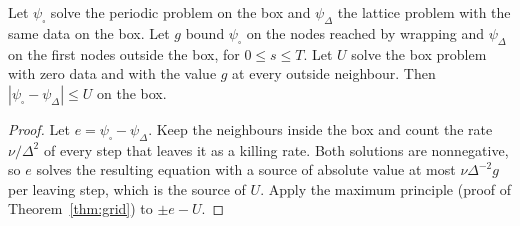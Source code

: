 \begin{proposition}
\label{prop:box}
Let $\psi_\square$ solve the periodic problem on the box and $\psi_\Delta$ the
lattice problem with the same data on the box. Let $g$ bound $\psi_\square$ on the nodes
reached by wrapping and $\psi_\Delta$ on the first nodes outside the box, for
$0\le s\le T$. Let $U$ solve the box problem with zero data and with the value
$g$ at every outside neighbour. Then $|\psi_\square-\psi_\Delta|\le U$ on the box.
\end{proposition}
\begin{proof}
Let $e=\psi_\square-\psi_\Delta$. Keep the neighbours inside the box and count the rate
$\nu/\Delta^2$ of every step that leaves it as a killing rate. Both solutions are
nonnegative, so $e$ solves the resulting equation with a source of
absolute value at most $\nu\Delta^{-2}g$ per leaving step, which is the source of $U$.
Apply the maximum principle (proof of Theorem~\ref{thm:grid}) to $\pm e-U$.
\end{proof}
